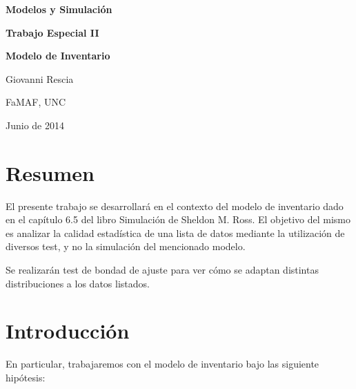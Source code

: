 \documentclass[a4paper,10pt]{article}
\begin{document}
\begin{titlepage}
\begin{center}
\vspace*{1.5in}
\begin{Large}
\textbf{Modelos y Simulación}
\vspace{0.5in}

\textbf{Trabajo Especial II}

\vspace{0.3in}
\textbf{Modelo de Inventario}

\vspace{1.5in}
Giovanni Rescia

\vspace*{0.4in}

FaMAF, UNC
\vspace*{.13in}

Junio de 2014
\end{Large}
\end{center}
\end{titlepage}

\author{Giovanni Rescia \\ \\ \large FaMAF}
\date{21 de Mayo de 2014}

\pagebreak

\section{Resumen}
\vspace{0.4in}
El presente trabajo se desarrollará en el contexto del modelo de inventario dado en el capítulo 6.5 del
libro Simulación de Sheldon M. Ross. El objetivo del mismo es analizar la calidad estadística de una lista
de datos mediante la utilización de diversos test, y no la simulación del mencionado modelo.

Se realizarán test de bondad de ajuste para ver cómo se adaptan distintas distribuciones a los datos listados.

\pagebreak

\section{Introducción}
\vspace{0.4in}

En particular, trabajaremos con el modelo de inventario bajo las siguiente hipótesis:
\end{document}
